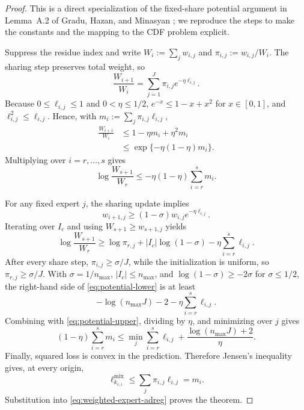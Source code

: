 \documentclass[11pt]{article}
\newcommand{\1}{\mathbf{1}}
\begin{document}
\begin{proof}
This is a direct specialization of the fixed-share potential argument in
Lemma~A.2 of Gradu, Hazan, and Minasyan \cite{gradu2023}; we reproduce the
steps to make the constants and the mapping to the CDF problem explicit.

Suppress the residue index and write
$W_i:=\sum_j w_{i,j}$ and
$\pi_{i,j}:=w_{i,j}/W_i$.  The sharing step preserves total weight, so
\begin{equation}
    \frac{W_{i+1}}{W_i}
    =
    \sum_{j=1}^J
    \pi_{i,j}e^{-\eta\ell_{i,j}}.
    \label{eq:weight-potential-ratio}
\end{equation}
Because $0\le\ell_{i,j}\le1$ and $0<\eta\le1/2$,
$e^{-x}\le 1-x+x^2$ for $x\in[0,1]$, and
$\ell_{i,j}^2\le\ell_{i,j}$.  Hence, with
$m_i:=\sum_j\pi_{i,j}\ell_{i,j}$,
\begin{align*}
    \frac{W_{i+1}}{W_i}
    &\le
    1-\eta m_i+\eta^2m_i
    \\
    &\le
    \exp\{-\eta(1-\eta)m_i\}.
\end{align*}
Multiplying over $i=r,\ldots,s$ gives
\begin{equation}
    \log\frac{W_{s+1}}{W_r}
    \le
    -\eta(1-\eta)
    \sum_{i=r}^s m_i.
    \label{eq:potential-upper}
\end{equation}

For any fixed expert $j$, the sharing update implies
\[
    w_{i+1,j}
    \ge
    (1-\sigma)w_{i,j}e^{-\eta\ell_{i,j}}.
\]
Iterating over $I_c$ and using $W_{s+1}\ge w_{s+1,j}$ yields
\begin{equation}
    \log\frac{W_{s+1}}{W_r}
    \ge
    \log\pi_{r,j}
    +|I_c|\log(1-\sigma)
    -\eta\sum_{i=r}^s\ell_{i,j}.
    \label{eq:potential-lower}
\end{equation}
After every share step, $\pi_{i,j}\ge\sigma/J$, while the initialization is
uniform, so $\pi_{r,j}\ge\sigma/J$.  With
$\sigma=1/n_{\max}$, $|I_c|\le n_{\max}$, and
$\log(1-\sigma)\ge-2\sigma$ for $\sigma\le1/2$, the right-hand side of
\eqref{eq:potential-lower} is at least
\[
    -\log(n_{\max}J)-2
    -\eta\sum_{i=r}^s\ell_{i,j}.
\]
Combining with \eqref{eq:potential-upper}, dividing by $\eta$, and minimizing
over $j$ gives
\begin{equation}
    (1-\eta)
    \sum_{i=r}^s m_i
    \le
    \min_j\sum_{i=r}^s\ell_{i,j}
    +
    \frac{\log(n_{\max}J)+2}{\eta}.
    \label{eq:weighted-expert-adreg}
\end{equation}
Finally, squared loss is convex in the prediction.  Therefore Jensen's
inequality gives, at every origin,
\[
    \ell_{k_{c,i}}^{\mathrm{mix}}
    \le
    \sum_j\pi_{i,j}\ell_{i,j}
    =m_i.
\]
Substitution into \eqref{eq:weighted-expert-adreg} proves the theorem.
\end{proof}
\end{document}
